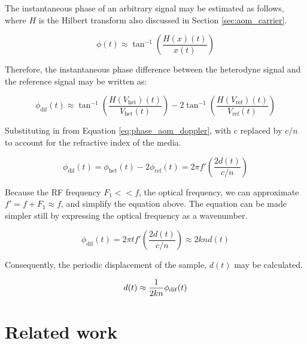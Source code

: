 The instantaneous phase of an arbitrary signal may be estimated as follows, where $H$ is the Hilbert transform also discussed in Section \ref{sec:aom_carrier}.

\begin{equation}
\phi(t) \approx \tan^{-1} \left( \frac{H(x)(t)}{x(t)} \right)
\end{equation}

Therefore, the instantaneous phase difference between the heterodyne signal and the reference signal may be written as:

\begin{equation}
\phi_{\mathrm{dif}}(t) \approx \tan^{-1}\left( \frac{H(V_{\mathrm{het}})(t)}{V_{\mathrm{het}}(t)} \right) - 2\tan^{-1}\left( \frac{H(V_{\mathrm{ref}})(t)}{V_{\mathrm{ref}}(t)} \right)
\end{equation}

Substituting in from Equation \ref{eq:phase_aom_doppler}, with $c$ replaced by $c/n$ to account for the refractive index of the media.

\begin{equation}
\phi_{\mathrm{dif}}(t) = \phi_{\mathrm{het}}(t) - 2 \phi_{\mathrm{ref}}(t) = 2 \pi f' \left( \frac{2 d(t)}{c/n} \right)
\end{equation}

Because the RF frequency $F_1 << f$, the optical frequency, we can approximate $f' = f + F_1 \approx f$, and simplify the equation above. The equation can be made simpler still by expressing the optical frequency as a wavenumber.

\begin{equation}
\phi_{\mathrm{dif}}(t) = 2 \pi t f'  \left( \frac{2 d(t)}{c/n} \right) \approx 2 k n d(t)
\end{equation}

Consequently, the periodic displacement of the sample, $d(t)$ may be calculated.

\begin{equation} d(t)  \approx \frac{1}{2kn} \phi_{\mathrm{dif}}(t) \\
\end{equation}

\section{Related work}

